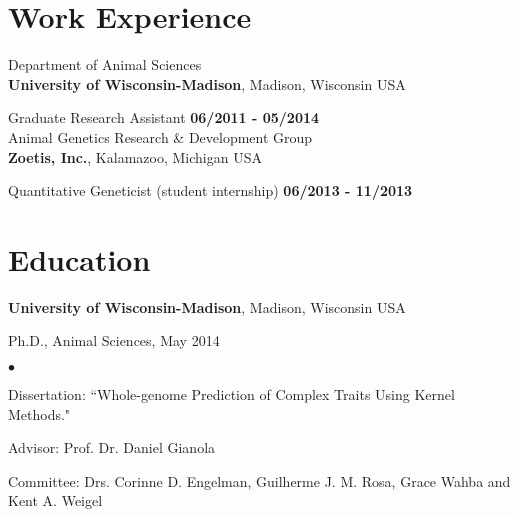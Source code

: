 \documentclass[margin,line,10pt]{res}
\newenvironment{list1}{
  \begin{list}{\ding{113}}{%
      \setlength{\itemsep}{0in}
      \setlength{\parsep}{0in} \setlength{\parskip}{0in}
      \setlength{\topsep}{0in} \setlength{\partopsep}{0in} 
      \setlength{\leftmargin}{0.17in}}}{\end{list}}
\newenvironment{list2}{
  \begin{list}{$\bullet$}{%
      \setlength{\itemsep}{0in}
      \setlength{\parsep}{0in} \setlength{\parskip}{0in}
      \setlength{\topsep}{0in} \setlength{\partopsep}{0in} 
      \setlength{\leftmargin}{0.2in}}}{\end{list}}
\begin{document}
\begin{resume}
\begin{comment}
\section{\sc Professional   Appointments}
Affiliate Faculty Member \\
Department of xxx\\
{\bf University of Nebraska-Lincoln}, Lincoln, Nebraska USA
\end{comment}


\section{\sc Work \phantom{1cm} Experience}
Department of Animal Sciences\\
{\bf University of Wisconsin-Madison}, Madison, Wisconsin USA


\vspace{-.3cm}

Graduate Research Assistant   \hfill {\bf 06/2011 - 05/2014}\\


Animal Genetics Research \& Development  Group \\
{\bf Zoetis, Inc.}, Kalamazoo, Michigan USA

\vspace{-.3cm}

Quantitative Geneticist (student internship)   \hfill {\bf 06/2013 - 11/2013}\\



\section{\sc Education}

{\bf University of Wisconsin-Madison}, Madison, Wisconsin USA\\
\vspace*{-.1in}
\begin{list1}
\item[] Ph.D., Animal Sciences, May 2014
\begin{list2}
\vspace*{.05in}
\item Dissertation: ``Whole-genome Prediction of Complex Traits Using Kernel Methods." 
\item Advisor: Prof. Dr. Daniel Gianola 
\item Committee: Drs. Corinne D. Engelman, Guilherme J. M. Rosa, Grace Wahba and Kent A. Weigel
\end{list2}
\vspace*{.05in}
\end{list1}






\end{resume}
\end{document}
